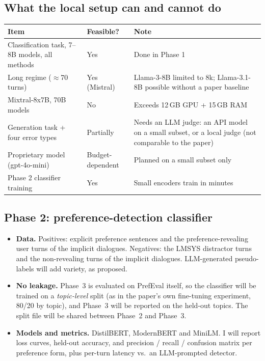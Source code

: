 \documentclass[11pt,a4paper]{article}
\begin{document}
\subsection{What the local setup can and cannot do}
\begin{center}\small
\begin{tabular}{p{6.2cm}p{2.0cm}p{6.2cm}}
\toprule
Item & Feasible? & Note \\
\midrule
Classification task, 7--8B models, all methods & Yes & Done in Phase 1 \\
Long regime ($\approx$70 turns) & Yes (Mistral) & Llama-3-8B limited to 8k; Llama-3.1-8B possible without a paper baseline \\
Mixtral-8x7B, 70B models & No & Exceeds 12\,GB GPU + 15\,GB RAM \\
Generation task + four error types & Partially & Needs an LLM judge: an API model on a small subset, or a local judge (not comparable to the paper) \\
Proprietary model (gpt-4o-mini) & Budget-dependent & Planned on a small subset only \\
Phase 2 classifier training & Yes & Small encoders train in minutes \\
\bottomrule
\end{tabular}
\end{center}

\subsection{Phase 2: preference-detection classifier}
\begin{itemize}
  \item \textbf{Data.} Positives: explicit preference sentences and the preference-revealing user turns of the implicit
        dialogues. Negatives: the LMSYS distractor turns and the non-revealing turns of the implicit dialogues. LLM-generated pseudo-labels will add
        variety, as proposed.
  \item \textbf{No leakage.} Phase~3 is evaluated on PrefEval itself, so the classifier will be trained on a \emph{topic-level}
        split (as in the paper's own fine-tuning experiment, 80/20 by topic), and Phase~3 will be reported on the held-out topics. The split
        file will be shared between Phase~2 and Phase~3.
  \item \textbf{Models and metrics.} DistilBERT, ModernBERT and MiniLM. I will report loss curves, held-out accuracy, and precision / recall /
        confusion matrix per preference form, plus per-turn latency vs.\ an LLM-prompted detector.
\end{itemize}
\end{document}

